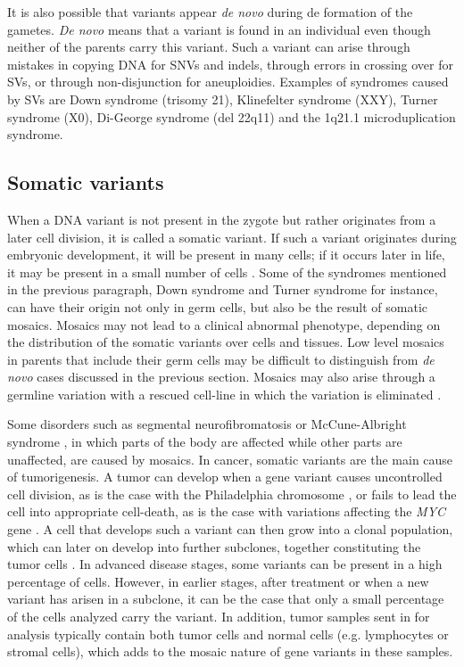 It is also possible that variants appear \textsl{de novo} during de formation of the gametes. 
\textsl{De novo} means that a variant is found in an individual even though neither of the parents carry this variant. 
Such a variant can arise through mistakes in copying DNA for SNVs and indels, through errors in crossing over for SVs, or through non-disjunction for aneuploidies. 
Examples of syndromes caused by SVs are Down syndrome (trisomy 21), Klinefelter syndrome (XXY), Turner syndrome (X0), Di-George syndrome (del 22q11) and the 1q21.1 microduplication syndrome.


\subsection {Somatic variants}
When a DNA variant is not present in the zygote but rather originates from a later cell division, it is called a somatic variant. 
If such a variant originates during embryonic development, it will be present in many cells; if it occurs later in life, it may be present in a small number of cells \cite{Frank_2014}. 
Some of the syndromes mentioned in the previous paragraph, Down syndrome and Turner syndrome for instance, can have their origin not only in germ cells, but also be the result of somatic mosaics. 
Mosaics may not lead to a clinical abnormal phenotype, depending on the distribution of the somatic variants over cells and tissues. 
Low level mosaics in parents that include their germ cells may be difficult to distinguish from \textsl{de novo} cases discussed in the previous section. 
Mosaics may also arise through a germline variation with a rescued cell-line in which the variation is eliminated \cite{Devlin_2004,Hook_2014}. 

Some disorders such as segmental neurofibromatosis \cite{Sobjanek_2014} or McCune-Albright syndrome \cite{Dumitrescu_2008}, in which parts of the body are affected while other parts are unaffected, are caused by mosaics. 
In cancer, somatic variants are the main cause of tumorigenesis. 
A tumor can develop when a gene variant causes uncontrolled cell division, as is the case with the Philadelphia chromosome \cite{Kang_2016}, or fails to lead the cell into appropriate cell-death, as is the case with variations affecting the \textsl{MYC} gene \cite{Dominguez_Sola_2014}. 
A cell that develops such a variant can then grow into a clonal population, which can later on develop into further subclones, together constituting the tumor cells \cite{Nowell_1976,Naugler_2010,McGranahan_2017}. 
In advanced disease stages, some variants can be present in a high percentage of cells. 
However, in earlier stages, after treatment or when a new variant has arisen in a subclone, it can be the case that only a small percentage of the cells analyzed carry the variant. 
In addition, tumor samples sent in for analysis typically contain both tumor cells and normal cells (e.g. lymphocytes or stromal cells), which adds to the mosaic nature of gene variants in these samples.


